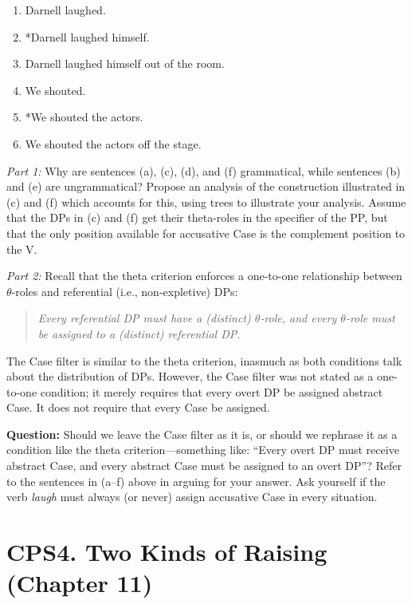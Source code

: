﻿\documentclass[11pt]{article}
\begin{document}
\begin{enumerate}
  \item[(a)] Darnell laughed.
  \item[(b)] *Darnell laughed himself.
  \item[(c)] Darnell laughed himself out of the room.
  \item[(d)] We shouted.
  \item[(e)] *We shouted the actors.
  \item[(f)] We shouted the actors off the stage.
\end{enumerate}

\vspace{3em}
\textit{Part 1:} Why are sentences (a), (c), (d), and (f) grammatical, while sentences (b) and (e) are ungrammatical? Propose an analysis of the construction illustrated in (c) and (f) which accounts for this, using trees to illustrate your analysis. Assume that the DPs in (c) and (f) get their theta-roles in the specifier of the PP, but that the only position available for accusative Case is the complement position to the V.

\vspace{5em}
\textit{Part 2:} Recall that the theta criterion enforces a one-to-one relationship between $\theta$-roles and referential (i.e., non-expletive) DPs:

\begin{quote}
\textit{Every referential DP must have a (distinct) $\theta$-role, and every $\theta$-role must be assigned to a (distinct) referential DP.}
\end{quote}

The Case filter is similar to the theta criterion, inasmuch as both conditions talk about the distribution of DPs. However, the Case filter was not stated as a one-to-one condition; it merely requires that every overt DP be assigned abstract Case. It does not require that every Case be assigned.

\vspace{5em}
\textbf{Question:} Should we leave the Case filter as it is, or should we rephrase it as a condition like the theta criterion---something like: ``Every overt DP must receive abstract Case, and every abstract Case must be assigned to an overt DP''? Refer to the sentences in (a--f) above in arguing for your answer. Ask yourself if the verb \textit{laugh} must always (or never) assign accusative Case in every situation.
\vspace{3em}
\newpage
\section*{CPS4. Two Kinds of Raising (Chapter 11)}
\end{document}
